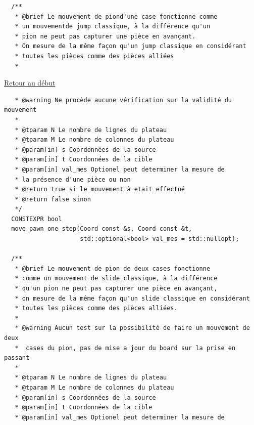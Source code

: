 {\begin{frame}[fragile]
\begin{verbatim}
  /**
   * @brief Le mouvement de piond'une case fonctionne comme
   * un mouvementde jump classique, à la différence qu'un
   * pion ne peut pas capturer une pièce en avançant.
   * On mesure de la même façon qu'un jump classique en considérant
   * toutes les pièces comme des pièces alliées
   *
\end{verbatim}
\end{frame}

\begin{frame}[fragile]
\hyperlink{conclusion}{Retour au début}\newline
\begin{verbatim}
   * @warning Ne procède aucune vérification sur la validité du mouvement
   *
   * @tparam N Le nombre de lignes du plateau
   * @tparam M Le nombre de colonnes du plateau
   * @param[in] s Coordonnées de la source
   * @param[in] t Coordonnées de la cible
   * @param[in] val_mes Optionel peut determiner la mesure de
   * la présence d'une pièce ou non
   * @return true si le mouvement à etait effectué
   * @return false sinon
   */
  CONSTEXPR bool
  move_pawn_one_step(Coord const &s, Coord const &t,
                     std::optional<bool> val_mes = std::nullopt);

  /**
   * @brief Le mouvement de pion de deux cases fonctionne
   * comme un mouvement de slide classique, à la différence
   * qu'un pion ne peut pas capturer une pièce en avançant,
   * on mesure de la même façon qu'un slide classique en considérant
   * toutes les pièces comme des pièces alliées.
   *
   * @warning Aucun test sur la possibilité de faire un mouvement de deux
   *  cases du pion, pas de mise a jour du board sur la prise en passant
   *
   * @tparam N Le nombre de lignes du plateau
   * @tparam M Le nombre de colonnes du plateau
   * @param[in] s Coordonnées de la source
   * @param[in] t Coordonnées de la cible
   * @param[in] val_mes Optionel peut determiner la mesure de
\end{verbatim}
\end{frame}

}
